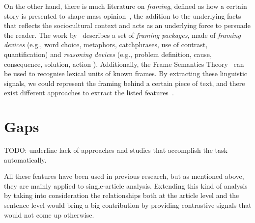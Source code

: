 On the other hand, there is much literature on \emph{framing}, defined
as how a certain story is presented to shape mass opinion~\cite{goffman1974frame}, the addition to the underlying facts that reflects the sociocultural context
and acts as an underlying force to persuade the reader.
The work by~\cite{gamson1989media} describes a set of \emph{framing packages}, made of \emph{framing devices} (e.g., word choice, metaphors, catchphrases, 
use of contrast, quantification) and \emph{reasoning devices} (e.g., problem definition, cause, consequence, solution, action%
).
Additionally, the Frame Semantics Theory~\cite{fillmore2006frame} can be used to recognise lexical units of known frames.
By extracting these linguistic signals, we could represent the framing behind a certain piece of text, and there exist different approaches to extract the listed features~\cite{mandal2017overview,gao2018neural,asghar2016automatic,swayamdipta:17}.


\section{Gaps}

TODO: underline lack of approaches and studies that accomplish the task automatically.

All these features have been used in previous research, but as mentioned above, they are mainly applied to single-article analysis. Extending this kind of analysis by taking into consideration the relationships both at the article level and the sentence level would bring a big contribution by providing contrastive signals that would not come up otherwise. 

% 